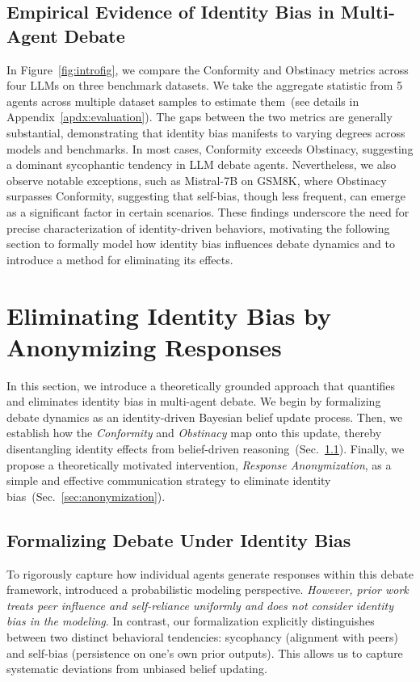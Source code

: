\documentclass{article}
\begin{document}
\subsection{Empirical Evidence of Identity Bias in Multi-Agent Debate}
In Figure~\ref{fig:introfig}, we compare the Conformity and Obstinacy metrics across four LLMs on three benchmark datasets. 
We take the aggregate statistic from 5 agents across multiple dataset samples to estimate them~(see details in Appendix~\ref{apdx:evaluation}).
The gaps between the two metrics are generally substantial, demonstrating that identity bias manifests to varying degrees across models and benchmarks. 
In most cases, Conformity exceeds Obstinacy, suggesting a dominant sycophantic tendency in LLM debate agents. 
Nevertheless, we also observe notable exceptions, such as Mistral-7B on GSM8K, where Obstinacy surpasses Conformity, suggesting that self-bias, though less frequent, can emerge as a significant factor in certain scenarios. 
These findings underscore the need for precise characterization of identity-driven behaviors, motivating the following section to formally model how identity bias influences debate dynamics and to introduce a method for eliminating its effects.




\section{Eliminating Identity Bias by Anonymizing Responses}

In this section, we introduce a theoretically grounded approach that quantifies and eliminates identity bias in multi-agent debate. 
We begin by formalizing debate dynamics as an identity-driven Bayesian belief update process. 
Then, we establish how the \textit{Conformity} and \textit{Obstinacy} map onto this update, thereby disentangling identity effects from belief-driven reasoning~(Sec.~\ref{sec:mad_formulation}). 
Finally, we propose a theoretically motivated intervention, \textit{Response Anonymization}, as a simple and effective communication strategy to eliminate identity bias~(Sec.~\ref{sec:anonymization}).



\subsection{Formalizing Debate Under Identity Bias}
\label{sec:mad_formulation}
To rigorously capture how individual agents generate responses within this debate framework, \cite{choi2025debate} introduced a probabilistic modeling perspective. \emph{However, prior work treats peer influence and self-reliance uniformly and does not consider identity bias in the modeling}. In contrast, our formalization explicitly distinguishes between two distinct behavioral tendencies: sycophancy (alignment with peers) and self-bias (persistence on one’s own prior outputs). This allows us to capture systematic deviations from unbiased belief updating. 
\end{document}

